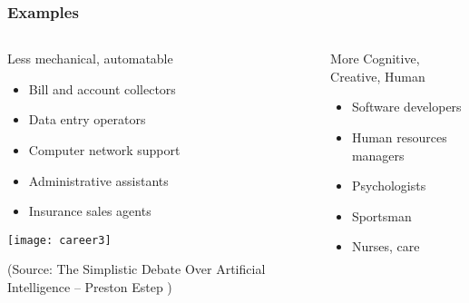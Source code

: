 \begin{frame}[fragile]\frametitle{Examples}
\begin{columns}
    \begin{column}[T]{0.5\linewidth}
		Less mechanical, automatable

      \begin{itemize}
		\item Bill and account collectors
		\item Data entry operators
		\item Computer network support 
		\item Administrative assistants
		\item Insurance sales agents
	  \end{itemize}
\begin{center}
\texttt{[image: career3]}
\end{center}

{\tiny (Source: The Simplistic Debate Over Artificial Intelligence – Preston Estep
)}

    \end{column}
    \begin{column}[T]{0.5\linewidth}
		More Cognitive, Creative, Human

      \begin{itemize}
		\item Software developers
		\item Human resources managers
		\item Psychologists
		\item Sportsman
		\item Nurses, care

	  \end{itemize}
    \end{column}
  \end{columns}
\end{frame}


